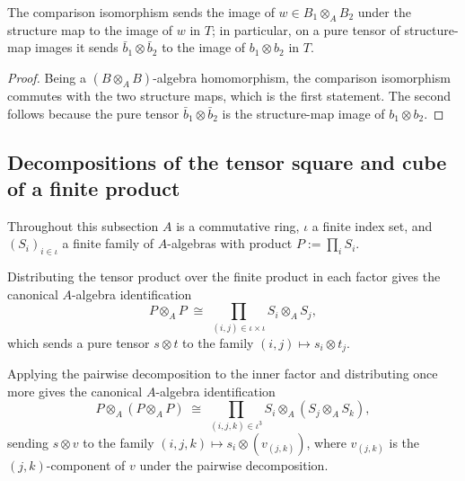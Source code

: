 \begin{lemma}
  \label{lem:tensorAwayEquiv_tmul}
  \leanok
  The comparison isomorphism sends the image of \(w \in B_1 \otimes_A B_2\) under the structure
  map to the image of \(w\) in \(T\); in particular, on a pure tensor of structure-map images it
  sends \(\bar b_1 \otimes \bar b_2\) to the image of \(b_1 \otimes b_2\) in \(T\).
\end{lemma}
\begin{proof}
  \leanok
  Being a \((B \otimes_A B)\)-algebra homomorphism, the comparison isomorphism commutes with the
  two structure maps, which is the first statement. The second follows because the pure tensor
  \(\bar b_1 \otimes \bar b_2\) is the structure-map image of \(b_1 \otimes b_2\).
\end{proof}

\subsection{Decompositions of the tensor square and cube of a finite product}

Throughout this subsection \(A\) is a commutative ring, \(\iota\) a finite index set, and
\((S_i)_{i \in \iota}\) a finite family of \(A\)-algebras with product \(P := \prod_{i} S_i\).

\begin{definition}
  \label{def:piDoubleEquivA}
  \leanok
  Distributing the tensor product over the finite product in each factor gives the canonical
  \(A\)-algebra identification
  \[
    P \otimes_A P \;\cong\; \prod_{(i,j) \in \iota \times \iota} S_i \otimes_A S_j ,
  \]
  which sends a pure tensor \(s \otimes t\) to the family \((i,j) \mapsto s_i \otimes t_j\).
\end{definition}

\begin{definition}
  \label{def:piTripleEquivA}
  \leanok
  Applying the pairwise decomposition to the inner factor and distributing once more gives the
  canonical \(A\)-algebra identification
  \[
    P \otimes_A (P \otimes_A P) \;\cong\;
      \prod_{(i,j,k) \in \iota^3} S_i \otimes_A (S_j \otimes_A S_k) ,
  \]
  sending \(s \otimes v\) to the family \((i,j,k) \mapsto s_i \otimes (v_{(j,k)})\), where
  \(v_{(j,k)}\) is the \((j,k)\)-component of \(v\) under the pairwise decomposition.
\end{definition}

